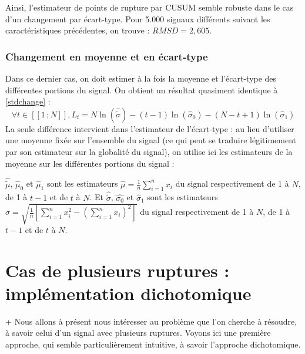\documentclass[french,11pt,notitlepage]{report}
\begin{document}
	Ainsi, l'estimateur de points de rupture par CUSUM semble robuste dans le cas d'un changement par écart-type. Pour 5.000 signaux différents suivant les caractéristiques précédentes, on trouve : $RMSD = 2,605$.
	
	
	\subsection{Changement en moyenne et en écart-type}
	
	
	Dans ce dernier cas, on doit estimer à la fois la moyenne et l'écart-type des différentes portions du signal. On obtient un résultat quasiment identique à \ref{stdchange} :
	\begin{equation}
		\forall t \in [\![1\,;N]\!], L_t = N\ln (\hat{\tilde\sigma}) - (t-1) \ln (\hat\sigma_0) - (N - t + 1) \ln (\hat\sigma_1)
		\label{bothchange}
	\end{equation}
	La seule différence intervient dans l'estimateur de l'écart-type :
	au lieu d'utiliser une moyenne fixée sur l'ensemble du signal (ce qui peut se traduire légitimement par son estimateur sur la globalité du signal),
	on utilise ici les estimateurs  de la moyenne sur les différentes portions du signal :
	
	$\hat{\tilde\mu}$, $\hat\mu_0$ et $\hat\mu_1$ sont les estimateurs $\hat\mu=\frac1n\sum_{i=1}^nx_i$ du signal respectivement de 1 à $N$, de 1 à $t-1$ et de $t$ à $N$.
	Et $\hat{\tilde\sigma}$, $\hat{\sigma_0}$ et $\hat\sigma_1$ sont les estimateurs $\hat\sigma=\sqrt{\frac1n\left[\sum_{i=1}^nx_i^2-(\sum_{i=1}^nx_i)^2\right]}$ du signal respectivement de 1 à $N$, de 1 à $t-1$ et de $t$ à $N$.	

	
	
	\chapter{Cas de plusieurs ruptures : implémentation dichotomique}
	 +	Nous allons à présent nous intéresser au problème que l'on cherche à résoudre, à savoir celui d'un signal avec plusieurs ruptures. Voyons ici une première approche, qui semble particulièrement intuitive, à savoir l'approche dichotomique.
	  
\end{document}
